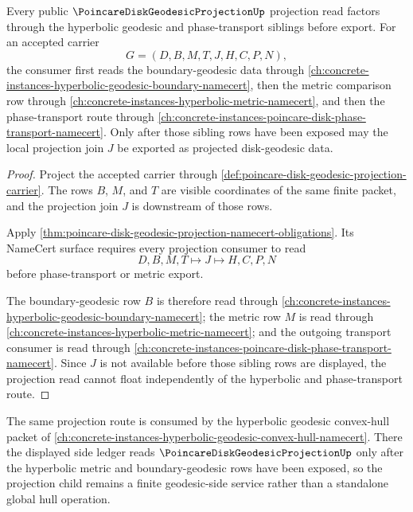 \begin{theorem}
\label{thm:poincare-disk-geodesic-projection-hyperbolic-route}
Every public $\PoincareDiskGeodesicProjectionUp$ projection read factors
through the hyperbolic geodesic and phase-transport siblings before export.
For an accepted carrier
$$
G=(D,B,M,T,J,H,C,P,N),
$$
the consumer first reads the boundary-geodesic data through
\autoref{ch:concrete-instances-hyperbolic-geodesic-boundary-namecert}, then the
metric comparison row through
\autoref{ch:concrete-instances-hyperbolic-metric-namecert}, and then the
phase-transport route through
\autoref{ch:concrete-instances-poincare-disk-phase-transport-namecert}. Only
after those sibling rows have been exposed may the local projection join $J$ be
exported as projected disk-geodesic data.
\end{theorem}
\begin{proof}
Project the accepted carrier through
\autoref{def:poincare-disk-geodesic-projection-carrier}. The rows $B$, $M$, and
$T$ are visible coordinates of the same finite packet, and the projection join
$J$ is downstream of those rows.

Apply
\autoref{thm:poincare-disk-geodesic-projection-namecert-obligations}. Its
NameCert surface requires every projection consumer to read
$$
D,B,M,T \longmapsto J \longmapsto H,C,P,N
$$
before phase-transport or metric export.

The boundary-geodesic row $B$ is therefore read through
\autoref{ch:concrete-instances-hyperbolic-geodesic-boundary-namecert}; the
metric row $M$ is read through
\autoref{ch:concrete-instances-hyperbolic-metric-namecert}; and the outgoing
transport consumer is read through
\autoref{ch:concrete-instances-poincare-disk-phase-transport-namecert}. Since
$J$ is not available before those sibling rows are displayed, the projection
read cannot float independently of the hyperbolic and phase-transport route.
\end{proof}

The same projection route is consumed by the hyperbolic geodesic convex-hull
packet of \autoref{ch:concrete-instances-hyperbolic-geodesic-convex-hull-namecert}.
There the displayed side ledger reads $\PoincareDiskGeodesicProjectionUp$ only
after the hyperbolic metric and boundary-geodesic rows have been exposed, so
the projection child remains a finite geodesic-side service rather than a
standalone global hull operation.
